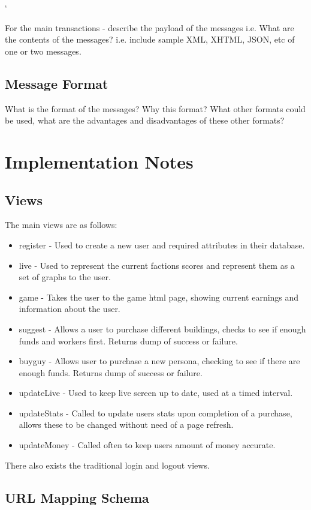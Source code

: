 `\documentclass{sig-alt-release2}
\begin{document}
For the main transactions - describe the payload of the messages 
i.e. What are the contents of the messages? i.e. include sample XML, XHTML, JSON, etc of one or two messages.

\subsection{Message Format}

What is the format of the messages? 
Why this format? 
What other formats could be used, what are the advantages and disadvantages of these other formats?

\section{Implementation Notes}

\subsection{Views}

The main views are as follows:
\begin{itemize}
\item register - Used to create a new user and required attributes in their database.
\item live - Used to represent the current factions scores and represent them as a set of graphs to the user.
\item game - Takes the user to the game html page, showing current earnings and information about the user.
\item suggest - Allows a user to purchase different buildings, checks to see if enough funds and workers first. Returns dump of success or failure.
\item buyguy - Allows user to purchase a new persona, checking to see if there are enough funds. Returns dump of success or failure.
\item updateLive - Used to keep live screen up to date, used at a timed interval.
\item updateStats - Called to update users stats upon completion of a purchase, allows these to be changed without need of a page refresh.
\item updateMoney - Called often to keep users amount of money accurate.
\end{itemize}
There also exists the traditional login and logout views.
\subsection{URL Mapping Schema}
\end{document}
